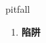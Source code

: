 
\begin{frame}
{\huge pitfall}
\begin{center}
\begin{enumerate}\Large
  \item \textbf{陷阱}
\end{enumerate}
\end{center}
\end{frame}
